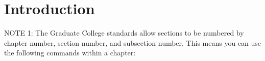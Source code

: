 \documentclass[edeposit,tocnosub,noragright,centerchapter,fullpagesingle,12pt]{uiuc_csthesis21}
\theoremstyle{definition}
\numberwithin{algocf}{chapter}     %
\begin{document}
%
\tableofcontents

\mainmatter

%

\chapter{Introduction}
\label{chp:intro}

 NOTE 1: The Graduate College standards allow sections to be numbered by chapter number, section number, and subsection number. This means you can use the following commands within a chapter:
 \cite{RosuJLAP10}
 \section{}



%

\end{document}
